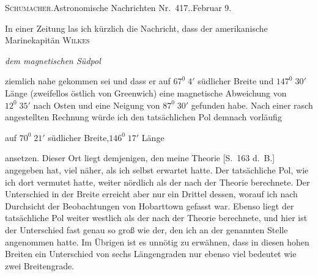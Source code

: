 \begin{center}\small\textsc{Schumacher}.\quad Astronomische Nachrichten Nr.\ 417..\quad Februar 9.\end{center}

In einer Zeitung las ich kürzlich die Nachricht, dass der amerikanische Marinekapitän \textsc{Wilkes}
\begin{center}\textit{dem magnetischen Südpol}\end{center}
ziemlich nahe gekommen sei und dass er auf $67^0\;4'$ südlicher Breite und $147^0\;30'$ Länge (zweifellos östlich von Greenwich) eine magnetische Abweichung von $12^0\;35'$ nach Osten und eine Neigung von $87^0\;30'$ gefunden habe. Nach einer rasch angestellten Rechnung würde ich den tatsächlichen Pol demnach vorläufig
\begin{center}auf $70^0\;21'$ südlicher Breite,\qquad $146^0\;17'$ Länge\end{center}
ansetzen. Dieser Ort liegt demjenigen, den meine Theorie [S.\ 163 d.\ B.] angegeben hat, viel näher, als ich selbst erwartet hatte. Der tatsächliche Pol, wie ich dort vermutet hatte, weiter nördlich als der nach der Theorie berechnete. Der Unterschied in der Breite erreicht aber nur ein Drittel dessen, worauf ich nach Durchsicht der Beobachtungen von Hobarttown gefasst war. Ebenso liegt der tatsächliche Pol weiter westlich als der nach der Theorie berechnete, und hier ist der Unterschied fast genau so groß wie der, den ich an der genannten Stelle angenommen hatte. Im Übrigen ist es unnötig zu erwähnen, dass in diesen hohen Breiten ein Unterschied von sechs Längengraden nur ebenso viel bedeutet wie zwei Breitengrade.

